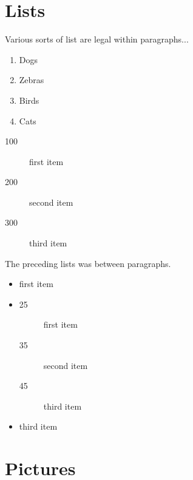 \documentclass[11pt,twoside]{article}\makeatletter
\makeatletter
\renewcommand\section{\@startsection {section}{1}{\z@}%
     {-1.75ex \@plus -0.5ex \@minus -.2ex}%
     {0.5ex \@plus .2ex}%
     {\reset@font\Large\bfseries\sffamily}}
\def\DivI{\section}
\def\DivI{\chapter}
\makeatother
\begin{document}
\DivI[Lists]{Lists}\label{P1}\par
Various sorts of list are legal within paragraphs... \begin{enumerate}

\item Dogs
\item Zebras
\item Birds
\item Cats
\end{enumerate}\begin{description}

\item[100]first item 
\item[200]second item 
\item[300]third item 
\end{description} \par
The preceding lists was between paragraphs.\par
{} \begin{itemize}

\item first item 
\item \begin{description}

\item[25]first item 
\item[35]second item 
\item[45]third item 
\end{description} 
\item third item 
\end{itemize} 
\DivI[Pictures]{Pictures} \par 
\end{document}
